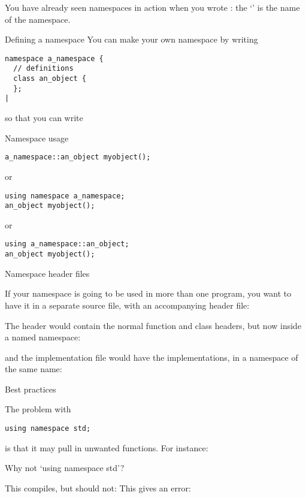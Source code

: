 You have already seen namespaces in action when you wrote
: the `' is the name of the namespace.

\begin{block}{Defining a namespace}
  \label{sl:namespace-def}
  You can make your own namespace by writing
\begin{verbatim}
namespace a_namespace {
  // definitions
  class an_object { 
  };
|
\end{verbatim}
\end{block}

so that you can write
\begin{block}{Namespace usage}
  \label{sl:namespace-use}
\begin{verbatim}
a_namespace::an_object myobject();
\end{verbatim}
or
\begin{verbatim}
using namespace a_namespace;
an_object myobject();
\end{verbatim}
or
\begin{verbatim}
using a_namespace::an_object;
an_object myobject();
\end{verbatim}
\end{block}

 {Namespace header files}

If your namespace is going to be used in more than one program, you
want to have it in a separate source file, with an accompanying header
file:
%

The header would contain the normal function and class headers, but
now inside a named namespace:
%

and the implementation file would have the implementations, in a
namespace of the same name:
%

 {Best practices}

The problem with
\begin{verbatim}
using namespace std;
\end{verbatim}
is that it may pull in unwanted functions. For instance:

\begin{block}{Why not `using namespace std'?}
  \label{sl:namespace-std-harm}
  \begin{multicols}{2}
    This compiles, but should not:
    \vfill\columnbreak
    This gives an error:
  \end{multicols}
\end{block}

